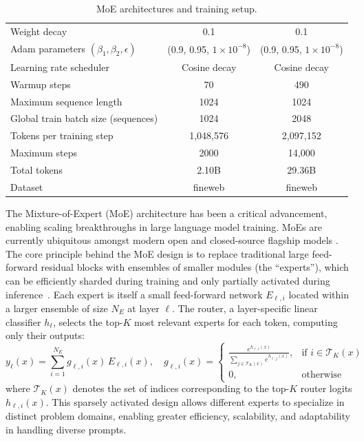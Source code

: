 \begin{table}[h]
\begin{tabular}{lcc}
Weight decay & 0.1 & 0.1 \\
Adam parameters $(\beta_1,\beta_2,\epsilon)$ & (0.9, 0.95, $1\!\times\!10^{-8}$) & (0.9, 0.95, $1\!\times\!10^{-8}$) \\
Learning rate scheduler & Cosine decay & Cosine decay \\
Warmup steps & 70 & 490 \\
\midrule
Maximum sequence length & 1024 & 1024 \\
Global train batch size (sequences) & 1024 & 2048 \\
Tokens per training step & 1{,}048{,}576 & 2{,}097{,}152 \\
Maximum steps & 2000 & 14{,}000 \\
Total tokens & 2.10B & 29.36B \\
Dataset & fineweb & fineweb \\
\bottomrule
\end{tabular}
\caption{MoE architectures and training setup.}
\label{tab:moe_hparams}
\end{table}

The Mixture-of-Expert (MoE) architecture \citep{moe_sem_1, moe_sem_2, moe_mod_1_2exp, moe_mod_2_switch_1exp} has been a critical advancement, enabling scaling breakthroughs in large language model training. MoEs are currently ubiquitous amongst modern open and closed-source flagship models \citep{moe_gemini15, guo2025deepseek, llama4, moe_qwen3, moe_gemini25}. The core principle behind the MoE design is to replace traditional large feed-forward residual blocks with ensembles of smaller modules (the ``experts''), which can be efficiently sharded during training and only partially activated during inference~\citep{moe_mod_2_switch_1exp}. Each expert is itself a small feed-forward network $E_{\ell,i}$ located within a larger ensemble of size $N_E$ at layer $\ell$. The router, a layer-specific linear classifier $h_\ell$, selects the top-$K$ most relevant experts for each token, computing only their outputs:
\begin{equation}
\label{eq:moe_layer_extended}
y_\ell(x) = \sum^{N_E}_{i=1} g_{\ell,i}(x)\, E_{\ell,i}(x), \quad
g_{\ell,i}(x) =
\begin{cases}
\frac{e^{h_{\ell,i}(x)}}{\sum_{j \in \mathcal{T}_K(x)} e^{h_{\ell,j}(x)}}, & \text{if } i \in \mathcal{T}_K(x) \\
0, & \text{otherwise}
\end{cases}
\end{equation}
where $\mathcal{T}_K(x)$ denotes the set of indices corresponding to the top-$K$ router logits $h_{\ell,i}(x)$. This sparsely activated design allows different experts to specialize in distinct problem domains, enabling greater efficiency, scalability, and adaptability in handling diverse prompts.

